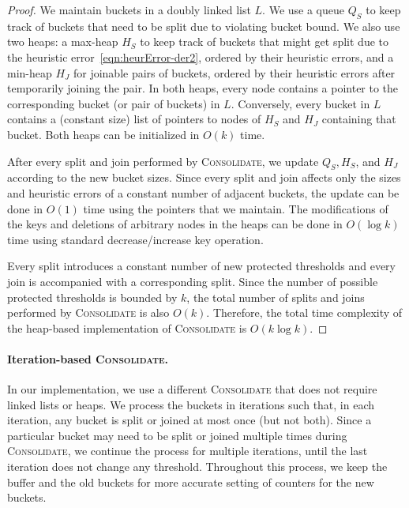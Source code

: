 \documentclass[acmsmall]{acmart}
\newcommand{\consolidate}{\textsc{Consolidate}\xspace}
\theoremstyle{remark}
\begin{document}
\begin{proof}
	We maintain buckets in a doubly linked list $L$. 
	We use a queue $Q_S$ to keep track of buckets that need to be split due to violating bucket bound.
	We also use two heaps: a max-heap $H_S$ to keep track of buckets that might get split due to the heuristic error~\eqref{eqn:heurError-der2}, ordered by their heuristic errors, and a min-heap $H_J$ for joinable pairs of buckets, ordered by their heuristic errors after temporarily joining the pair.
	In both heaps, every node contains a pointer to the corresponding bucket (or pair of buckets) in $L$.
	Conversely, every bucket in $L$ contains a (constant size) list of pointers to nodes of $H_S$ and $H_J$ containing that bucket. 
	Both heaps can be initialized in $O(k)$ time.
	
	After every split and join performed by \consolidate, we update $Q_S, H_S$, and $H_J$ according to the new bucket sizes.
	Since every split and join affects only the sizes and heuristic errors of a constant number of adjacent buckets, the update can be done in $O(1)$ time using the pointers that we maintain.
	The modifications of the keys and deletions of arbitrary nodes in the heaps can be done in $O(\log k)$ time using standard decrease/increase key operation.
	
	Every split introduces a constant number of new protected thresholds and every join is accompanied with a corresponding split.
	Since the number of possible protected thresholds is bounded by $k$, the total number of splits and joins performed by \consolidate is also $O(k)$.
	Therefore, the total time complexity of the heap-based implementation of \consolidate is $O(k \log k)$.
\end{proof}


\paragraph{Iteration-based \consolidate.}
In our implementation, we use a different \consolidate that does not require linked lists or heaps.
We process the buckets in iterations such that, in each iteration, any bucket is split or joined at most once (but not both).
Since a particular bucket may need to be split or joined multiple times during \consolidate, we continue the process for multiple iterations,
until the last iteration does not change any threshold.
Throughout this process, we keep the buffer and the old buckets
for more accurate setting of counters for the new buckets.
\end{document}
